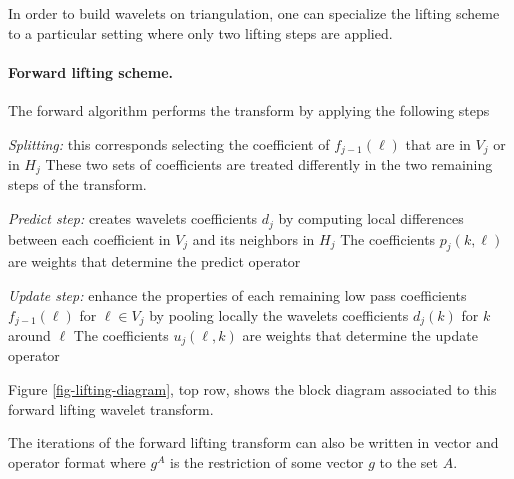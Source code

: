 In order to build wavelets on triangulation, one can specialize the lifting scheme to a particular setting where only two lifting steps are applied. 

\paragraph{Forward lifting scheme.}

The forward algorithm performs the transform
by applying the following steps
\begin{rs}
	\item \textit{Splitting:} this corresponds selecting the coefficient of $f_{j-1}(\ell)$ that are in $V_j$ or in $H_j$
		These two sets of coefficients are treated differently in the two remaining steps of the transform.
	\item \textit{Predict step:} creates wavelets coefficients $d_j$ by computing local differences between each coefficient in $V_j$ and its neighbors in $H_j$
		The coefficients $p_j(k,\ell)$ are weights that determine the predict operator 
	\item \textit{Update step:} enhance the properties of each remaining low pass coefficients $f_{j-1}(\ell)$ for $\ell \in V_j$ by pooling locally the wavelets coefficients $d_j(k)$ for $k$ around $\ell$
		The coefficients $u_j(\ell,k)$ are weights that determine the update operator 
\end{rs}
Figure \ref{fig-lifting-diagram}, top row, shows the block diagram associated to this forward lifting wavelet transform.

The iterations of the forward lifting transform can also be written in vector and operator format
where $g^A$ is the restriction of some vector $g$ to the set $A$. 


